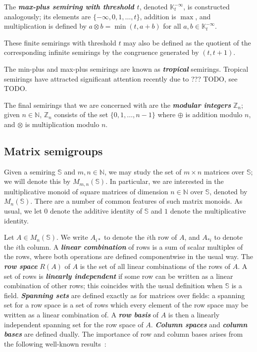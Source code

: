 \documentclass[11pt]{article}
\newcommand{\defn}[1]{\textbf{\textit{#1}}}
\numberwithin{equation}{section}
\newcommand{\N}{\mathbb{N}}
\newcommand{\Z}{\mathbb{Z}}
\newcommand{\K}{\mathbb{K}}
\begin{document}
The \defn{max-plus semiring with threshold $t$}, denoted $\K^{-\infty}_t$, is
constructed analogously; its elements are $\{-\infty, 0, 1, \ldots, t\}$,
addition is $\max$, and multiplication is defined by $a \otimes b = \min(t, a +
b)$ for all $a, b \in \K^{-\infty}_t$.

These finite semirings with threshold $t$ may also be defined as the quotient of
the corresponding infinite semirings by the congruence generated by $(t, t +
1)$.

The min-plus and max-plus semirings are known as \defn{tropical} semirings.
Tropical semirings have attracted significant attention recently due to ???
TODO, see TODO.

The final semirings that we are concerned with are the \defn{modular integers}
$\Z_n$; given $n \in \N$, $\Z_n$ consists of the set $\{0, 1, \ldots, n - 1\}$
where $\oplus$ is addition modulo $n$, and $\otimes$ is multiplication modulo
$n$.

\subsection{Matrix semigroups}
\label{sec:matsemigp}
Given a semiring $\mathbb{S}$ and $m, n \in \N$, we may study the set of $m
\times n$ matrices over $\mathbb{S}$; we will denote this by $M_{m,
  n}(\mathbb{S})$. In particular, we are interested in the multiplicative monoid
of square matrices of dimension $n \in
\N$ over $\mathbb{S}$, denoted by $M_n(\mathbb{S})$.
There are a number of common features of such matrix monoids. As usual, we let
$0$ denote the additive identity of $\mathbb{S}$ and $1$ denote the
multiplicative identity.

Let $A \in M_n(\mathbb{S})$. We write $A_{i*}$ to denote the $i$th row of $A$,
and $A_{*i}$ to denote the $i$th column. A \defn{linear combination} of rows is
a sum of scalar multiples of the rows, where both operations are defined
componentwise in the usual way. The \defn{row space}
$R(A)$ of $A$ is the set of all linear combinations of the rows of $A$. 
A set of rows is \defn{linearly independent} if some row can be written as a
linear combination of other rows; this coincides with the usual definition when
$\mathbb{S}$ is a field. \defn{Spanning sets} are defined exactly as for
matrices over fields: a spanning set for a row space is a set of rows which
every element of the row space may be written as a linear combination of. A
\defn{row basis} of $A$ is then a linearly independent spanning set for the row
space of $A$. \defn{Column spaces} and \defn{column bases} are defined dually.
The importance of row and column bases arises from the following well-known
results~\cite{TODO}:
\end{document}
